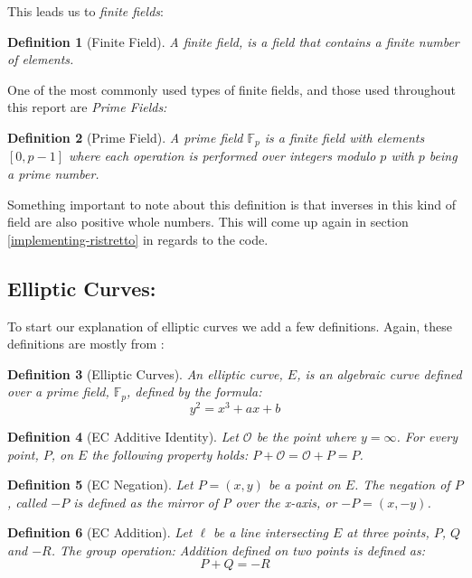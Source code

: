 \documentclass{article}
\newtheorem{definition}{Definition}[section]
\renewcommand{\O}{\mathcal{O}}
\newcommand{\F}{\mathbb{F}}
\begin{document}
This leads us to \textit{finite fields}:

\begin{definition}[Finite Field]
	A finite field, is a field that contains a finite number of elements.
\end{definition}

One of the most commonly used types of finite fields, and those used
throughout this report are \textit{Prime Fields:} 

\begin{definition}[Prime Field]
	A prime field $\F_p$ is a finite field with elements $[0,p-1]$
	where each operation is performed over integers modulo $p$
	with $p$ being a prime number.
\end{definition}

Something important to note about this definition is that inverses in
this kind of field are also positive whole numbers. This will come up
again in section \ref{implementing-ristretto} in regards to the code.

\subsection{Elliptic Curves:}\label{elliptic-curves}

To start our explanation of elliptic curves we add a few
definitions. Again, these definitions are mostly from
\cite{elliptic-curves}:

\begin{definition}[Elliptic Curves]
	An elliptic curve, $E$, is an algebraic curve defined over a
	prime field, $\F_p$, defined by the formula:
	$$y^2 = x^3 + ax + b$$
\end{definition}

\begin{definition}[EC Additive Identity]
	Let $\O$ be the point where $y = \infty$. For every point, $P$,
	on $E$ the following property holds:
	$P + \O = \O + P = P$.
\end{definition}

\begin{definition}[EC Negation]
	Let $P = (x,y)$ be a point on $E$. The negation of $P$, called $-P$
	is defined as the mirror of P over the x-axis, or $-P = (x,-y)$.
\end{definition}

\begin{definition}[EC Addition]
	Let $\ell$ be a line intersecting $E$ at three points, $P$, $Q$ and
	$-R$. The group operation: Addition defined on two points is defined
	as:
	$$P + Q = {-R}$$
\end{definition}
\end{document}
